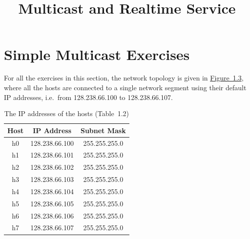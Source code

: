 \documentclass{../UTNetLab}
\title{Multicast and Realtime Service}
\begin{document}
\part{Simple Multicast Exercises\label{sec:simple-multicast}}
    For all the exercises in this section, the network topology is given in \hyperref[fig:1.3]{Figure~1.3}, where all the hosts are connected to a single network segment using their default IP addresses, i.e.\ from 128.238.66.100 to 128.238.66.107.
    
    \begin{minipage}{0.48\textwidth}
        \begin{flushleft}
            \begin{table}[H]
                \caption{The IP addresses of the hosts (Table~1.2)}
                \label{tab:1.2}
                \centering
                \begin{tabular}{ c c c }
                    \hline \hline
                    Host & IP Address & Subnet Mask \\
                    \hline 
                    h0 & 128.238.66.100 & 255.255.255.0 \\
                    h1 & 128.238.66.101 & 255.255.255.0 \\
                    h2 & 128.238.66.102 & 255.255.255.0 \\
                    h3 & 128.238.66.103 & 255.255.255.0 \\
                    h4 & 128.238.66.104 & 255.255.255.0 \\
                    h5 & 128.238.66.105 & 255.255.255.0 \\
                    h6 & 128.238.66.106 & 255.255.255.0 \\
                    h7 & 128.238.66.107 & 255.255.255.0 \\
                    \hline \hline
                    \end{tabular}
            \end{table}
        \end{flushleft}
    \end{minipage}
\end{document}
